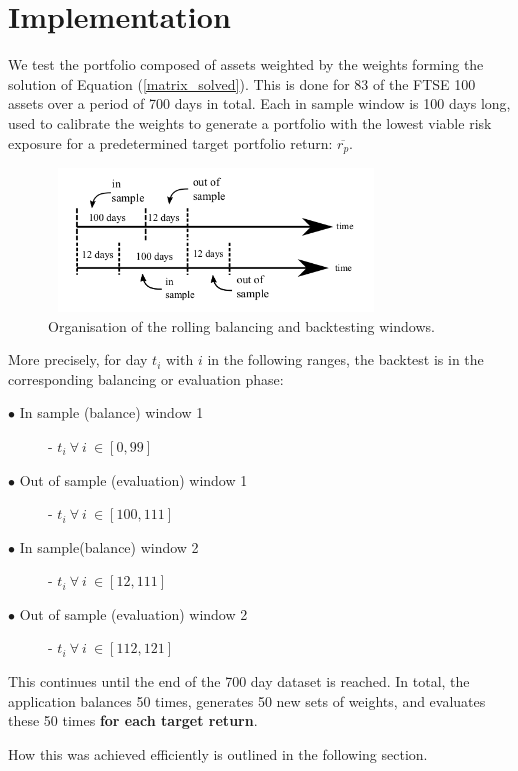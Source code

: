 \documentclass{article}
\begin{document}
\section{Implementation}
\label{sec:implementation}



We test the portfolio composed of assets weighted by the weights forming the solution of Equation (\ref{matrix_solved}). This is done for 83 of the FTSE 100 assets over a period of 700 days in total. Each in sample window is 100 days long, used to calibrate the weights to generate a portfolio with the lowest viable risk exposure for a predetermined target portfolio return: $\overline{r_p}$. 


\begin{figure}[H]
	\centerline{\includegraphics[width=3.5in,height=1.5in]{Figures/backtesting_windows.png}}
	\label{backtetsing_window}
	\caption{Organisation of the rolling balancing and backtesting windows. \cite{notes}}
\end{figure}

More precisely, for day $t_i$ with $i$ in the following ranges, the backtest is in the corresponding balancing or evaluation phase:  

\begin{description}
	\item [$\bullet$ In sample (balance) window 1] - $t_i\:\forall\:i\:\in [0,99]$
	\item [$\bullet$ Out of sample (evaluation) window 1] - $t_i\:\forall\:i\:\in [100,111]$
	\item [$\bullet$ In sample(balance) window 2] - $t_i\:\forall\:i\:\in [12, 111]$
	\item [$\bullet$ Out of sample (evaluation) window 2] - $t_i\:\forall\:i\:\in [112, 121]$
\end{description}

This continues until the end of the 700 day dataset is reached. In total, the application balances 50 times, generates 50 new sets of weights, and evaluates these 50 times \textbf{for each target return}.

How this was achieved efficiently is outlined in the following section.
\end{document}

